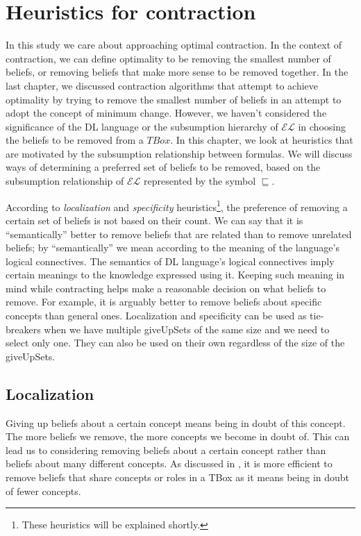 \chapter{Heuristics for contraction}
\label{heuristics}
In this study we care about approaching optimal contraction. In the context of contraction, we can define optimality to be removing the smallest number of beliefs, or removing beliefs that make more sense to be removed together. In the last chapter, we discussed contraction algorithms that attempt to achieve optimality by trying to remove the smallest number of beliefs in an attempt to adopt the concept of minimum change. However, we haven't considered the significance of the DL language or the subsumption hierarchy of $\mathcal{EL}$ in choosing the beliefs to be removed from a $TBox$. In this chapter, we look at heuristics that are motivated by the subsumption relationship between formulas. We will discuss ways of determining a preferred set of beliefs to be removed, based on the subsumption relationship of $\mathcal{EL}$ represented by the symbol $\sqsubseteq$. 

According to \textit{localization} and \textit{specificity} heuristics\footnote{These heuristics will be explained shortly.}, the preference of removing a certain set of beliefs is not based on their count. We can say that it is ``semantically'' better to remove beliefs that are related than to remove unrelated beliefs; by ``semantically'' we mean according to the meaning of the language's logical connectives. The semantics of DL language's logical connectives imply certain meanings to the knowledge expressed using it. Keeping such meaning in mind while contracting helps make a reasonable decision on what beliefs to remove. For example, it is arguably better to remove beliefs about specific concepts than general ones. Localization and specificity can be used as tie-breakers when we have multiple giveUpSets of the same size and we need to select only one. They can also be used on their own regardless of the size of the giveUpSets.

\section{Localization}
Giving up beliefs about a certain concept means being in doubt of this concept. The more beliefs we remove, the more concepts we become in doubt of. This can lead us to considering removing beliefs about a certain concept rather than beliefs about many different concepts. As discussed in \cite{zwei}, it is more efficient to remove beliefs that share concepts or roles in a TBox as it means being in doubt of fewer concepts.

